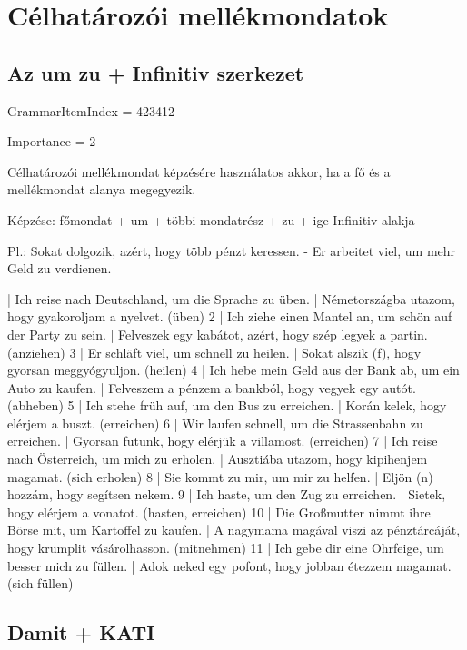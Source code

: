 \documentclass{article}
\newenvironment{desc}{\verbatim}{\endverbatim}
\newenvironment{exmp}{\verbatim}{\endverbatim}
\begin{document}
\section{Célhatározói mellékmondatok}

\subsection{Az um zu + Infinitiv szerkezet}

GrammarItemIndex = 423412

Importance = 2

\begin{desc}
Célhatározói mellékmondat képzésére használatos akkor, ha a fő és a mellékmondat alanya megegyezik.

Képzése:
főmondat + um + többi mondatrész + zu + ige Infinitiv alakja

Pl.: Sokat dolgozik, azért, hogy több pénzt keressen. - Er arbeitet viel, um mehr Geld zu verdienen.
\end{desc}

\begin{exmp}
1 | Ich reise nach Deutschland, um die Sprache zu üben. | Németországba utazom, hogy gyakoroljam a nyelvet. (üben)
2 | Ich ziehe einen Mantel an, um schön auf der Party zu sein. | Felveszek egy kabátot, azért, hogy szép legyek a partin. (anziehen)
3 | Er schläft viel, um schnell zu heilen. | Sokat alszik (f), hogy gyorsan meggyógyuljon. (heilen)
4 | Ich hebe mein Geld aus der Bank ab, um ein Auto zu kaufen. | Felveszem a pénzem a bankból, hogy vegyek egy autót. (abheben)
5 | Ich stehe früh auf, um den Bus zu erreichen. | Korán kelek, hogy elérjem a buszt. (erreichen)
6 | Wir laufen schnell, um die Strassenbahn zu erreichen. | Gyorsan futunk, hogy elérjük a villamost. (erreichen)
7 | Ich reise nach Österreich, um mich zu erholen. | Ausztiába utazom, hogy kipihenjem magamat. (sich erholen)
8 | Sie kommt zu mir, um mir zu helfen. | Eljön (n) hozzám, hogy segítsen nekem.
9 | Ich haste, um den Zug zu erreichen. | Sietek, hogy elérjem a vonatot. (hasten, erreichen)
10 | Die Großmutter nimmt ihre Börse mit, um Kartoffel zu kaufen. | A nagymama magával viszi az pénztárcáját, hogy krumplit vásárolhasson. (mitnehmen)
11 | Ich gebe dir eine Ohrfeige, um besser mich zu füllen. | Adok neked egy pofont, hogy jobban étezzem magamat. (sich füllen)
\end{exmp}

\subsection{Damit + KATI}
\end{document}
